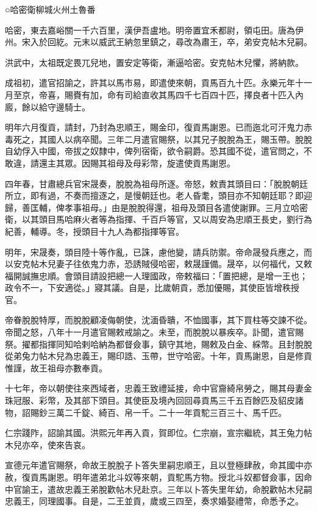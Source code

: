 
\begin{pinyinscope}
○哈密衛柳城火州土魯番

哈密，東去嘉峪關一千六百里，漢伊吾盧地。明帝置宜禾都尉，領屯田。唐為伊州。宋入於回紇。元末以威武王納忽里鎮之，尋改為肅王，卒，弟安克帖木兒嗣。

洪武中，太祖既定畏兀兒地，置安定等衛，漸逼哈密。安克帖木兒懼，將納款。

成祖初，遣官招諭之，許其以馬市易，即遣使來朝，貢馬百九十匹。永樂元年十一月至京，帝喜，賜賚有加，命有司給直收其馬四千七百四十匹，擇良者十匹入內廄，餘以給守邊騎士。

明年六月復貢，請封，乃封為忠順王，賜金印，復貢馬謝恩。已而迤北可汗鬼力赤毒死之，其國人以病卒聞。三年二月遣官賜祭，以其兄子脫脫為王，賜玉帶。脫脫自幼俘入中國，帝拔之奴隸中，俾列宿衛，欲令嗣爵。恐其國不從，遣官問之，不敢違，請還主其眾。因賜其祖母及母彩幣，旋遣使貢馬謝恩。

四年春，甘肅總兵官宋晟奏，脫脫為祖母所逐。帝怒，敕責其頭目曰：「脫脫朝廷所立，即有過，不奏而擅逐之，是慢朝廷也。老人昏耄，頭目亦不知朝廷耶？即迎歸，善匡輔，俾孝事祖母。」由是脫脫得還，祖母及頭目各遣使謝罪。三月立哈密衛，以其頭目馬哈麻火者等為指揮、千百戶等官，又以周安為忠順王長史，劉行為紀善，輔導。冬，授頭目十九人為都指揮等官。

明年，宋晟奏，頭目陸十等作亂，已誅，慮他變，請兵防禦。帝命晟發兵應之，而以安克帖木兒妻子往依鬼力赤，恐誘賊侵哈密，敕晟謹備。晟卒，以何福代，又敕福開誠撫忠順。會頭目請設把總一人理國政，帝敕福曰：「置把總，是增一王也；政令不一，下安適從。」寢其議。自是，比歲朝貢，悉加優賜，其使臣皆增秩授官。

帝眷脫脫特厚，而脫脫顧凌侮朝使，沈湎昏聵，不恤國事，其下買柱等交諫不從。帝聞之怒，八年十一月遣官賜敕戒諭之。未至，而脫脫以暴疾卒。訃聞，遣官賜祭。擢都指揮同知哈剌哈納為都督僉事，鎮守其地，賜敕及白金、綵幣。且封脫脫從弟兔力帖木兒為忠義王，賜印誥、玉帶，世守哈密。十年，貢馬謝恩，自是修貢惟謹，故王祖母亦數奉貢。

十七年，帝以朝使往來西域者，忠義王致禮延接，命中官齎綺帛勞之，賜其母妻金珠冠服、彩幣，及其部下頭目。其使臣及境內回回尋貢馬三千五百餘匹及貂皮諸物，詔賜鈔三萬二千錠、綺百、帛一千。二十一年貢駝三百三十、馬千匹。

仁宗踐阼，詔諭其國。洪熙元年再入貢，賀即位。仁宗崩，宣宗繼統，其王兔力帖木兒亦卒，使來告哀。

宣德元年遣官賜祭，命故王脫脫子卜答失里嗣忠順王，且以登極肆赦，命其國中亦赦，復貢馬謝恩。明年遣弟北斗奴等來朝，貢駝馬方物。授北斗奴都督僉事，因命中官諭王，遣故忠義王弟脫歡帖木兒赴京。三年以卜答失里年幼，命脫歡帖木兒嗣忠義王，同理國事。自是，二王並貢，歲或三四至，奏求婚娶禮幣，命悉予之。


\end{pinyinscope}
